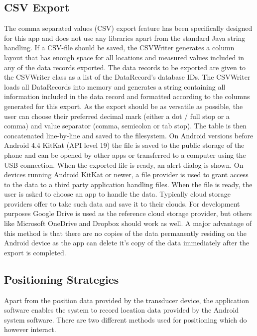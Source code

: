 \subsection{CSV Export}
\label{subs:csv_export}
The comma separated values (CSV) export feature has been specifically designed for this app and does not use any libraries apart from the standard Java string handling. If a CSV-file should be saved, the CSVWriter generates a column layout that has enough space for all locations and measured values included in any of the data records exported. The data records to be exported are given to the CSVWriter class as a list of the DataRecord's database IDs. The CSVWriter loads all DataRecords into memory and generates a string containing all information included in the data record and formatted according to the columns generated for this export. As the export should be as versatile as possible, the user can choose their preferred decimal mark (either a dot / full stop or a comma) and value separator (comma, semicolon or tab stop). The table is then concatenated line-by-line and saved to the filesystem. On Android versions before Android 4.4 KitKat (API level 19) the file is saved to the public storage of the phone and can be opened by other apps or transferred to a computer using the USB connection. When the exported file is ready, an alert dialog is shown. On devices running Android KitKat or newer, a file provider is used to grant access to the data to a third party application handling files. When the file is ready, the user is asked to choose an app to handle the data. Typically cloud storage providers offer to take such data and save it to their clouds. For development purposes Google Drive is used as the reference cloud storage provider, but others like Microsoft OneDrive and Dropbox should work as well. A major advantage of this method is that there are no copies of the data permanently residing on the Android device as the app can delete it's copy of the data immediately after the export is completed.

\subsection{Positioning Strategies}
\label{subs:geolocalisation_strategies}
Apart from the position data provided by the transducer device, the application software enables the system to record location data provided by the Android system software. There are two different methods used for positioning which do however interact.

